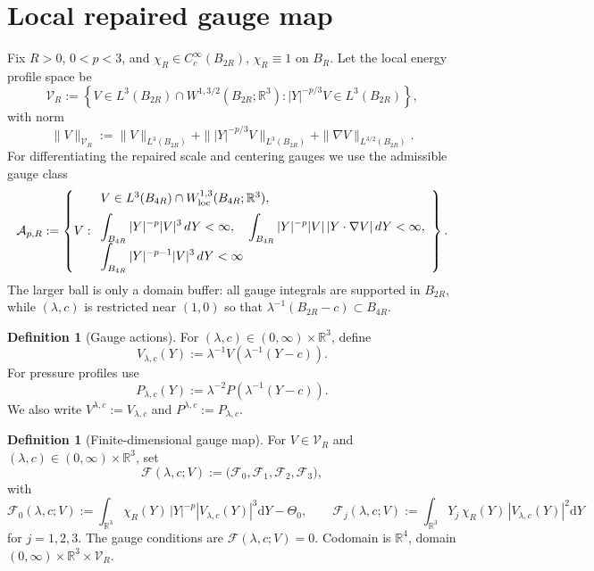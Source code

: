 \documentclass[11pt]{amsart}
\theoremstyle{plain}
\theoremstyle{definition}
\newtheorem{definition}[theorem]{Definition}
\theoremstyle{remark}
\newcommand{\dd}{\mathrm d}
\newcommand{\RR}{\mathbb R}
\newcommand{\nn}{\nabla}
\begin{document}
\section{Local repaired gauge map}\label{sec:gauge-map}

Fix \(R>0\), \(0<p<3\), and \(\chi_R\in C_c^\infty(B_{2R})\), \(\chi_R\equiv1\) on
\(B_R\). Let the local energy profile space be
\[
\mathcal V_R:=\left\{V\in L^3(B_{2R})\cap W^{1,3/2}(B_{2R};\RR^3):
|Y|^{-p/3}V\in L^3(B_{2R})\right\},
\]
with norm
\[
\|V\|_{\mathcal V_R}:=\|V\|_{L^3(B_{2R})}
+\||Y|^{-p/3}V\|_{L^3(B_{2R})}
+\|\nn V\|_{L^{3/2}(B_{2R})}.
\]
For differentiating the repaired scale and centering gauges we use the
admissible gauge class
\[
\mathcal A_{p,R}:=\left\{V:
\begin{array}{l}
V\in L^3(B_{4R})\cap W^{1,3}_{\rm loc}(B_{4R};\RR^3),\\[2mm]
\displaystyle \int_{B_{4R}}|Y|^{-p}|V|^3\,dY<\infty,\quad
\displaystyle \int_{B_{4R}}|Y|^{-p}|V|\,|Y\cdot\nabla V|\,dY<\infty,\\[2mm]
\displaystyle \int_{B_{4R}}|Y|^{-p-1}|V|^3\,dY<\infty
\end{array}\right\}.
\]
The larger ball is only a domain buffer: all gauge integrals are supported in
\(B_{2R}\), while \((\lambda,c)\) is restricted near \((1,0)\) so that
\(\lambda^{-1}(B_{2R}-c)\subset B_{4R}\).

\begin{definition}[Gauge actions]\label{def:gauge-action}
For \((\lambda,c)\in (0,\infty)\times\RR^3\), define
\[
V_{\lambda,c}(Y):=\lambda^{-1}V(\lambda^{-1}(Y-c)).
\]
For pressure profiles use
\[
P_{\lambda,c}(Y):=\lambda^{-2}P(\lambda^{-1}(Y-c)).
\]
We also write \(V^{\lambda,c}:=V_{\lambda,c}\) and \(P^{\lambda,c}:=P_{\lambda,c}\).
\end{definition}

\begin{definition}[Finite-dimensional gauge map]\label{def:gauge-map}
For \(V\in\mathcal V_R\) and \( (\lambda,c) \in (0,\infty)\times\RR^3\), set
\[
\mathcal F(\lambda,c;V)
:=\bigl(\mathcal F_0,\mathcal F_1,\mathcal F_2,\mathcal F_3\bigr),
\]
with
\[
\mathcal F_0(\lambda,c;V):=
\int_{\RR^3}\chi_R(Y)\,|Y|^{-p}|V_{\lambda,c}(Y)|^3\dd Y-\Theta_0,\qquad
\mathcal F_j(\lambda,c;V):=\int_{\RR^3}Y_j\,\chi_R(Y)\,|V_{\lambda,c}(Y)|^2\dd Y
\]
for \(j=1,2,3\). The gauge conditions are \(\mathcal F(\lambda,c;V)=0\).
Codomain is \(\RR^4\), domain \((0,\infty)\times\RR^3\times\mathcal V_R\).
\end{definition}
\end{document}
